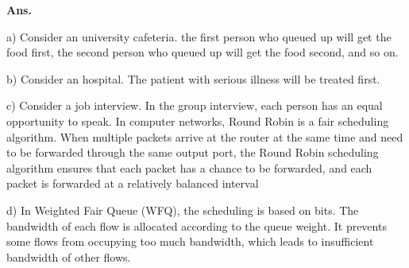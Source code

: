 \documentclass[12pt, a4paper, UTF8, fontset=windows]{ctexbook}
\newenvironment{solution}{\par\noindent\textbf{Ans.}}{\par}
\begin{document}
\begin{solution}

    a) Consider an university cafeteria. the first person who queued up will get the food first, the second person who queued up will get the food second, and so on.
    
    b) Consider an hospital. The patient with serious illness will be treated first. 
    
    c) Consider a job interview. In the group interview, each person has an equal opportunity to speak.
    In computer networks, Round Robin is a fair scheduling algorithm. When multiple packets arrive at the router at the same time and need to be forwarded through the same output port, 
    the Round Robin scheduling algorithm ensures that each packet has a chance to be forwarded, and each packet is forwarded at a relatively balanced interval
    
    d) In Weighted Fair Queue (WFQ), the scheduling is based on bits. The bandwidth of each flow is allocated according to the queue weight.
    It prevents some flows from occupying too much bandwidth, which leads to insufficient bandwidth of other flows.
\end{solution}
\end{document}
